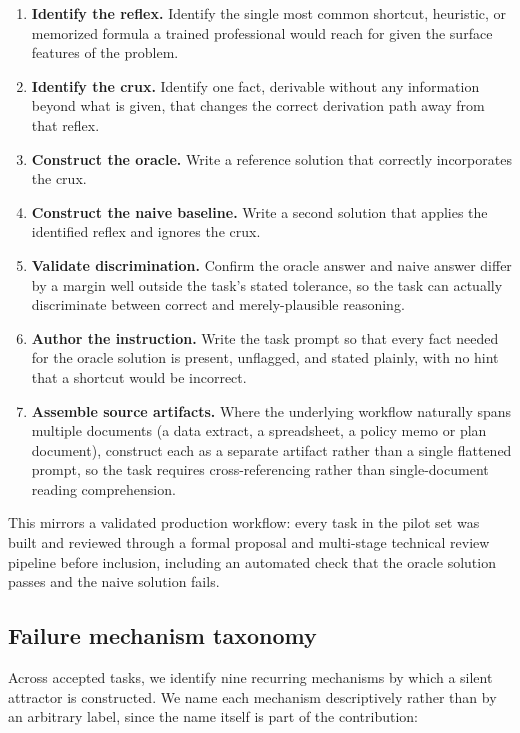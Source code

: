 \documentclass[11pt]{article}
\begin{document}
\begin{enumerate}
  \item \textbf{Identify the reflex.} Identify the single most common
    shortcut, heuristic, or memorized formula a trained professional
    would reach for given the surface features of the problem.
  \item \textbf{Identify the crux.} Identify one fact, derivable
    without any information beyond what is given, that changes the
    correct derivation path away from that reflex.
  \item \textbf{Construct the oracle.} Write a reference solution that
    correctly incorporates the crux.
  \item \textbf{Construct the naive baseline.} Write a second solution
    that applies the identified reflex and ignores the crux.
  \item \textbf{Validate discrimination.} Confirm the oracle answer and
    naive answer differ by a margin well outside the task's stated
    tolerance, so the task can actually discriminate between correct
    and merely-plausible reasoning.
  \item \textbf{Author the instruction.} Write the task prompt so that
    every fact needed for the oracle solution is present, unflagged,
    and stated plainly, with no hint that a shortcut would be
    incorrect.
  \item \textbf{Assemble source artifacts.} Where the underlying
    workflow naturally spans multiple documents (a data extract, a
    spreadsheet, a policy memo or plan document), construct each as a
    separate artifact rather than a single flattened prompt, so the
    task requires cross-referencing rather than single-document
    reading comprehension.
\end{enumerate}

This mirrors a validated production workflow: every task in the pilot
set was built and reviewed through a formal proposal and multi-stage
technical review pipeline before inclusion, including an automated
check that the oracle solution passes and the naive solution fails.

\subsection{Failure mechanism taxonomy}

Across accepted tasks, we identify nine recurring mechanisms by which a
silent attractor is constructed. We name each mechanism descriptively
rather than by an arbitrary label, since the name itself is part of
the contribution:
\end{document}
